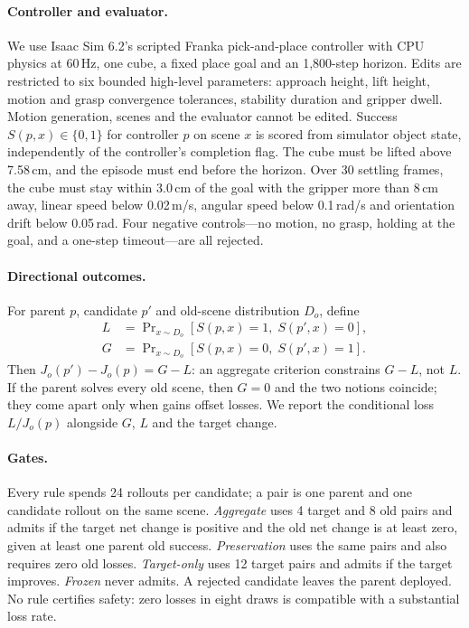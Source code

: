 \documentclass[letterpaper]{article} %
\begin{document}
\paragraph{Controller and evaluator.} We use Isaac Sim 6.2's scripted Franka pick-and-place controller \citep{nvidia2026franka} with CPU physics at 60\,Hz, one cube, a fixed place goal and an 1{,}800-step horizon. Edits are restricted to six bounded high-level parameters: approach height, lift height, motion and grasp convergence tolerances, stability duration and gripper dwell. Motion generation, scenes and the evaluator cannot be edited. Success $S(p,x)\in\{0,1\}$ for controller $p$ on scene $x$ is scored from simulator object state, independently of the controller's completion flag. The cube must be lifted above 7.58\,cm, and the episode must end before the horizon. Over 30 settling frames, the cube must stay within 3.0\,cm of the goal with the gripper more than 8\,cm away, linear speed below 0.02\,m/s, angular speed below 0.1\,rad/s and orientation drift below 0.05\,rad. Four negative controls---no motion, no grasp, holding at the goal, and a one-step timeout---are all rejected.

\paragraph{Directional outcomes.} For parent $p$, candidate $p'$ and old-scene distribution $D_o$, define
\begin{align*}
L &= \Pr\nolimits_{x\sim D_o}[S(p,x)=1,\; S(p',x)=0],\\
G &= \Pr\nolimits_{x\sim D_o}[S(p,x)=0,\; S(p',x)=1].
\end{align*}
Then $J_o(p')-J_o(p)=G-L$: an aggregate criterion constrains $G-L$, not $L$. If the parent solves every old scene, then $G=0$ and the two notions coincide; they come apart only when gains offset losses. We report the conditional loss $L/J_o(p)$ alongside $G$, $L$ and the target change.

\paragraph{Gates.} Every rule spends 24 rollouts per candidate; a pair is one parent and one candidate rollout on the same scene. \emph{Aggregate} uses 4 target and 8 old pairs and admits if the target net change is positive and the old net change is at least zero, given at least one parent old success. \emph{Preservation} uses the same pairs and also requires zero old losses. \emph{Target-only} uses 12 target pairs and admits if the target improves. \emph{Frozen} never admits. A rejected candidate leaves the parent deployed. No rule certifies safety: zero losses in eight draws is compatible with a substantial loss rate.
\end{document}
